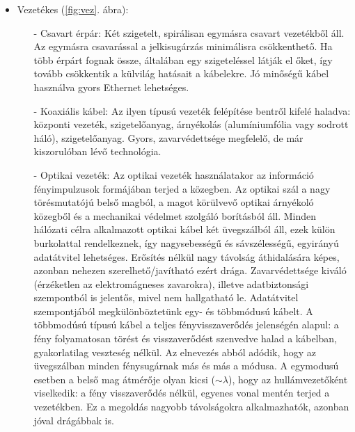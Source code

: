 \documentclass[12pt]{article}
\theoremstyle{plain}
\begin{document}
\begin{itemize}
\item Vezetékes (\ref{fig:vez}. ábra):
\begin{itemize}
\item[-] Csavart érpár: Két szigetelt, spirálisan egymásra csavart vezetékből áll. Az egymásra csavarással a jelkisugárzás minimálisra csökkenthető. Ha több érpárt fognak össze, általában egy szigeteléssel látják el őket, így tovább csökkentik a külvilág hatásait a kábelekre. Jó minőségű kábel használva gyors Ethernet lehetséges.
\item[-] Koaxiális kábel: Az ilyen típusú vezeték felépítése bentről kifelé haladva: központi vezeték, szigetelőanyag, árnyékolás (alumíniumfólia vagy sodrott háló), szigetelőanyag. Gyors, zavarvédettsége megfelelő, de már kiszorulóban lévő technológia.
\item[-] Optikai vezeték: Az optikai vezeték használatakor az információ fényimpulzusok formájában terjed a közegben. Az optikai szál a nagy törésmutatójú belső magból, a magot körülvevő optikai árnyékoló közegből és a mechanikai védelmet szolgáló borításból áll. Minden hálózati célra alkalmazott optikai kábel két üvegszálból áll, ezek külön burkolattal rendelkeznek, így nagysebességű és sávszélességű, egyirányú adatátvitel lehetséges. Erősítés nélkül nagy távolság áthidalására képes, azonban nehezen szerelhető/javítható ezért drága. Zavarvédettsége kiváló (érzéketlen az elektromágneses zavarokra), illetve adatbiztonsági szempontból is jelentős, mivel nem hallgatható le. Adatátvitel szempontjából megkülönböztetünk egy- és többmódusú kábelt. A többmodúsú típusú kábel a teljes fényvisszaverődés jelenségén alapul: a fény folyamatosan törést és visszaverődést szenvedve halad a kábelban, gyakorlatilag veszteség nélkül. Az elnevezés abból adódik, hogy az üvegszálban minden fénysugárnak más és más a módusa. A egymodusú esetben a belső mag átmérője olyan kicsi ($\sim \lambda$), hogy az hullámvezetőként viselkedik: a fény visszaverődés nélkül, egyenes vonal mentén terjed a vezetékben. Ez a megoldás nagyobb távolságokra alkalmazhatók, azonban jóval drágábbak is.  
\end{itemize}


\end{itemize}
\end{document}
